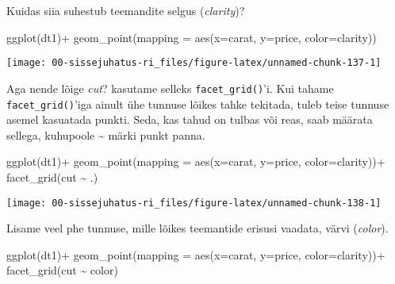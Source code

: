 \documentclass[
]{book}
\newenvironment{Shaded}{\begin{snugshade}}{\end{snugshade}}
\newcommand{\AttributeTok}[1]{\textcolor[rgb]{0.77,0.63,0.00}{#1}}
\newcommand{\FunctionTok}[1]{\textcolor[rgb]{0.00,0.00,0.00}{#1}}
\newcommand{\NormalTok}[1]{#1}
\newcommand{\SpecialCharTok}[1]{\textcolor[rgb]{0.00,0.00,0.00}{#1}}
\begin{document}
Kuidas siia suhestub teemandite selgus (\emph{clarity})?

\begin{Shaded}
\begin{Highlighting}[]
\FunctionTok{ggplot}\NormalTok{(dt1)}\SpecialCharTok{+}
  \FunctionTok{geom\_point}\NormalTok{(}\AttributeTok{mapping =} \FunctionTok{aes}\NormalTok{(}\AttributeTok{x=}\NormalTok{carat, }\AttributeTok{y=}\NormalTok{price, }\AttributeTok{color=}\NormalTok{clarity))}
\end{Highlighting}
\end{Shaded}

\begin{center}\texttt{[image: 00-sissejuhatus-ri\_files/figure-latex/unnamed-chunk-137-1]} \end{center}

Aga nende lõige \emph{cut}? kasutame selleks \texttt{facet\_grid()}'i. Kui tahame \texttt{facet\_grid()}'iga ainult ühe tunnuse lõikes tahke tekitada, tuleb teise tunnuse asemel kasuatada punkti. Seda, kas tahud on tulbas või reas, saab määrata sellega, kuhupoole \textasciitilde{} märki punkt panna.

\begin{Shaded}
\begin{Highlighting}[]
\FunctionTok{ggplot}\NormalTok{(dt1)}\SpecialCharTok{+}
  \FunctionTok{geom\_point}\NormalTok{(}\AttributeTok{mapping =} \FunctionTok{aes}\NormalTok{(}\AttributeTok{x=}\NormalTok{carat, }\AttributeTok{y=}\NormalTok{price, }\AttributeTok{color=}\NormalTok{clarity))}\SpecialCharTok{+}
  \FunctionTok{facet\_grid}\NormalTok{(cut }\SpecialCharTok{\textasciitilde{}}\NormalTok{ .)}
\end{Highlighting}
\end{Shaded}

\begin{center}\texttt{[image: 00-sissejuhatus-ri\_files/figure-latex/unnamed-chunk-138-1]} \end{center}

Lisame veel phe tunnuse, mille lõikes teemantide erisusi vaadata, värvi (\emph{color}).

\begin{Shaded}
\begin{Highlighting}[]
\FunctionTok{ggplot}\NormalTok{(dt1)}\SpecialCharTok{+}
  \FunctionTok{geom\_point}\NormalTok{(}\AttributeTok{mapping =} \FunctionTok{aes}\NormalTok{(}\AttributeTok{x=}\NormalTok{carat, }\AttributeTok{y=}\NormalTok{price, }\AttributeTok{color=}\NormalTok{clarity))}\SpecialCharTok{+}
  \FunctionTok{facet\_grid}\NormalTok{(cut }\SpecialCharTok{\textasciitilde{}}\NormalTok{ color)}
\end{Highlighting}
\end{Shaded}
\end{document}
